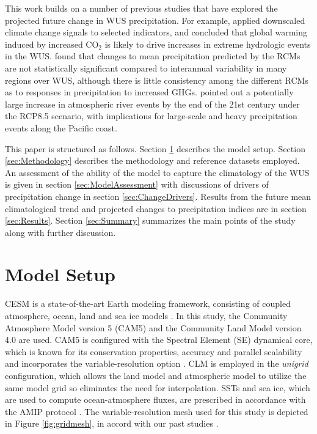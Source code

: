 This work builds on a number of previous studies that have explored the projected future change in WUS precipitation. For example, \cite{kim2005projection} applied downscaled climate change signals to selected indicators, and concluded that global warming induced by increased CO$_2$ is likely to drive increases in extreme hydrologic events in the WUS. \cite{duffy2006simulations} found that changes to mean precipitation predicted by the RCMs are not statistically significant compared to interannual variability in many regions over WUS, although there is little consistency among the different RCMs as to responses in precipitation to increased GHGs. \cite{gao2015dynamical} pointed out a potentially large increase in atmospheric river events by the end of the 21st century under the RCP8.5 scenario, with implications for large-scale and heavy precipitation events along the Pacific coast. 


This paper is structured as follows. Section \ref{sec:ModelSetup} describes the model setup.  Section \ref{sec:Methodology} describes the methodology and reference datasets employed. An assessment of the ability of the model to capture the climatology of the WUS is given in section \ref{sec:ModelAssessment} with discussions of drivers of precipitation change in section \ref{sec:ChangeDrivers}. Results from the future mean climatological trend and projected changes to precipitation indices are in section \ref{sec:Results}. Section \ref{sec:Summary} summarizes the main points of the study along with further discussion.


\section{Model Setup} \label{sec:ModelSetup}

CESM is a state-of-the-art Earth modeling framework, consisting of coupled atmosphere, ocean, land and sea ice models \cite{CAM5Tech, hurrell2013community}. In this study, the Community Atmosphere Model version 5 (CAM5) \cite{CAM5Tech} and the Community Land Model version 4.0 \cite{CLM40Tech} are used.  CAM5 is configured with the Spectral Element (SE) dynamical core, which is known for its conservation properties, accuracy and parallel scalability \cite{dennis2011cam, taylor2011conservation} and incorporates the variable-resolution option \cite{zarzycki2014using}.  CLM is employed in the \textit{unigrid} configuration, which allows the land model and atmospheric model to utilize the same model grid so eliminates the need for interpolation.  SSTs and sea ice, which are used to compute ocean-atmosphere fluxes, are prescribed in accordance with the AMIP protocol \cite{Gates1992}. The variable-resolution mesh used for this study is depicted in Figure \ref{fig:gridmesh}, in accord with our past studies \cite{rhoades2015characterizing, huang2016evaluation, huang2016irrigation, rhoades2016projecting}.

